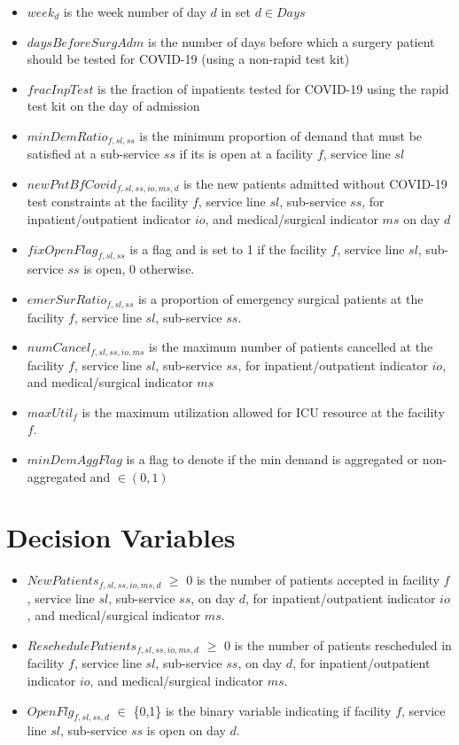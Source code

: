 \documentclass[10pt, letterpaper]{article}
\begin{document}
\begin{itemize}
\item[ ] $week_{d}$ is the week number of day $d$ in set $ d \in Days$
\item[ ] $daysBeforeSurgAdm$ is the number of days before which a surgery patient should be tested for COVID-19 (using a non-rapid test kit) 
\item[ ] $fracInpTest$ is the fraction of inpatients tested for COVID-19 using the rapid test kit on the day of admission 
\item[ ] $minDemRatio_{f,sl,ss}$ is the minimum proportion of demand that must be satisfied at a sub-service $ss$ if its is open at a facility $f$, service line $sl$ 
\item[ ] $newPntBfCovid_{f,sl,ss,io,ms,d}$ is the new patients admitted without COVID-19 test constraints at the facility $f$, service line $sl$, sub-service $ss$, for inpatient/outpatient indicator $io$, and medical/surgical indicator $ms$ on day $d$ 
\item[ ] $fixOpenFlag_{f,sl,ss}$ is a flag and is set to 1 if the facility $f$, service line $sl$, sub-service $ss$ is open, 0 otherwise. 
\item[ ] $emerSurRatio_{f,sl,ss}$ is a proportion of emergency surgical patients at the facility $f$, service line $sl$, sub-service $ss$. 
\item[ ] $numCancel_{f,sl,ss,io,ms}$ is the maximum number of patients cancelled at the facility $f$, service line $sl$, sub-service $ss$, for inpatient/outpatient indicator $io$, and medical/surgical indicator $ms$
\item[ ] $maxUtil_{f}$ is the maximum utilization allowed for ICU resource at the facility $f$.
\item[ ] $minDemAggFlag$ is a flag to denote if the min demand is aggregated or non-aggregated and $ \in (0,1) $
\end{itemize}

\section*{Decision Variables}
\begin{itemize}
\item [ ] $NewPatients_{f,sl,ss,io,ms,d}$ $\geq$ {0} is the number of patients accepted in facility $f$, service line $sl$, sub-service $ss$, on day $d$, for inpatient/outpatient indicator $io$, and medical/surgical indicator $ms$.
\item [ ] $ReschedulePatients_{f,sl,ss,io,ms,d}$ $\geq$ {0} is the number of patients rescheduled in facility $f$, service line $sl$, sub-service $ss$, on day $d$, for inpatient/outpatient indicator $io$, and medical/surgical indicator $ms$.
\item [ ] $OpenFlg_{f,sl,ss,d}$ $\in$ \{0,1\} is the binary variable indicating if facility $f$, service line $sl$, sub-service $ss$ is open on day $d$.
\end{itemize}
\end{document}
